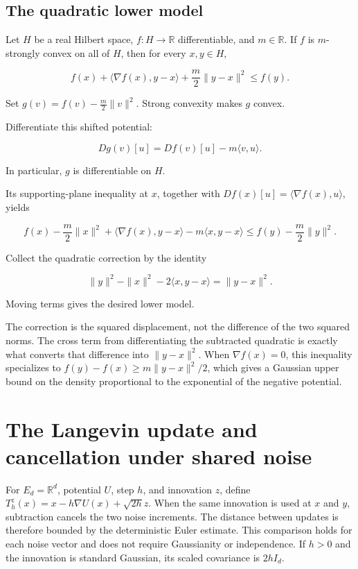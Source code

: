 \documentclass[11pt,a4paper]{report}
\begin{document}
\subsection{\texorpdfstring{The quadratic lower model}{The quadratic lower model}}
\label{report-step-UnadjustedLangevin-StrongConvexity-lean-3}


Let \(H\) be a real Hilbert space, \(f:H\to\mathbb R\) differentiable, and \(m\in\mathbb R\). If \(f\) is \(m\)-strongly convex on all of \(H\), then for every \(x,y\in H\),

\[f(x)+\langle\nabla f(x),y-x\rangle+\frac m2\|y-x\|^2\le f(y).\]

Set \(g(v)=f(v)-\frac m2\|v\|^2\). Strong convexity makes \(g\) convex.



Differentiate this shifted potential:

\[Dg(v)[u]=Df(v)[u]-m\langle v,u\rangle.\]

In particular, \(g\) is differentiable on \(H\).



Its supporting-plane inequality at \(x\), together with \(Df(x)[u]=\langle\nabla f(x),u\rangle\), yields

\[f(x)-\frac m2\|x\|^2+\langle\nabla f(x),y-x\rangle-m\langle x,y-x\rangle\le f(y)-\frac m2\|y\|^2.\]

Collect the quadratic correction by the identity

\[\|y\|^2-\|x\|^2-2\langle x,y-x\rangle=\|y-x\|^2.\]

Moving terms gives the desired lower model.



The correction is the squared displacement, not the difference of the two squared norms. The cross term from differentiating the subtracted quadratic is exactly what converts that difference into \(\|y-x\|^2\). When \(\nabla f(x)=0\), this inequality specializes to \(f(y)-f(x)\ge m\|y-x\|^2/2\), which gives a Gaussian upper bound on the density proportional to the exponential of the negative potential.

\section{\texorpdfstring{The Langevin update and cancellation under shared noise}{The Langevin update and cancellation under shared noise}}
\label{proof-module-UnadjustedLangevin-ULAStep-lean}


For \(E_d=\mathbb R^d\), potential \(U\), step \(h\), and innovation \(z\), define \(T_h^z(x)=x-h\nabla U(x)+\sqrt{2h}z\). When the same innovation is used at \(x\) and \(y\), subtraction cancels the two noise increments. The distance between updates is therefore bounded by the deterministic Euler estimate. This comparison holds for each noise vector and does not require Gaussianity or independence. If \(h>0\) and the innovation is standard Gaussian, its scaled covariance is \(2hI_d\).
\end{document}

